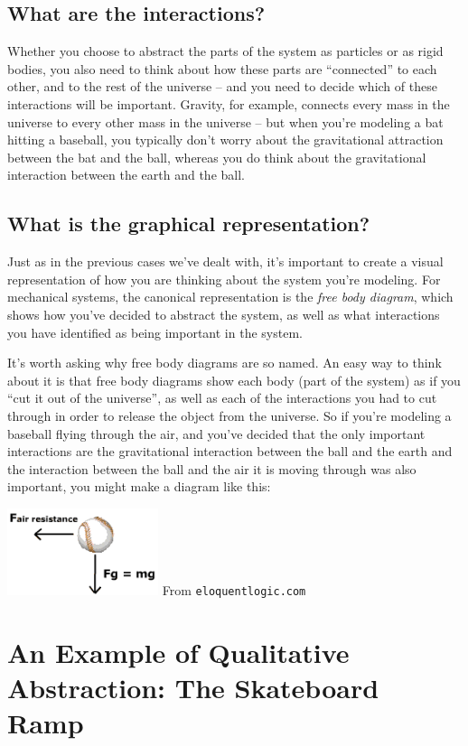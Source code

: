 \documentclass{tufte-handout}
\begin{document}
\subsection{What are the interactions?}
Whether you choose to abstract the parts of the system as particles or as rigid bodies, you also need to think about how these parts are ``connected'' to each other, and to the rest of the universe -- and you need to decide which of these interactions will be important.  Gravity, for example, connects every mass in the universe to every other mass in the universe -- but when you're modeling a bat hitting a baseball, you typically don't worry about the gravitational attraction between the bat and the ball, whereas you do think about the gravitational interaction between the earth and the ball. 

\subsection{What is the graphical representation?}

Just as in the previous cases we've dealt with, it's important to create a visual representation of how you are thinking about the system you're modeling.  For mechanical systems, the canonical representation is the {\it free body diagram}, which shows how you've decided to abstract the system, as well as what interactions you have identified as being important in the system.  

It's worth asking why free body diagrams are so named.  An easy way to think about it is that free body diagrams show each body (part of the system) as if you ``cut it out of the universe'', as well as each of the interactions you had to cut through in order to release the object from the universe.  So if you're modeling a baseball flying through the air, and you've decided that the only important interactions are the gravitational interaction between the ball and the earth and the interaction between the ball and the air it is moving through was also important, you might make a diagram like this:


\centerline{\includegraphics[height=1in]{figs/baseballfbd}
From {\tt eloquentlogic.com}}


\section{An Example of Qualitative Abstraction: The Skateboard Ramp}
\end{document}
